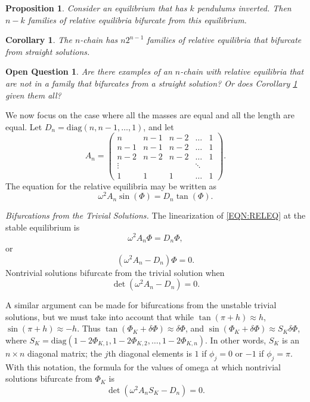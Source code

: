 \documentclass[11pt]{amsart}
\newtheorem{prop}{Proposition}
\newtheorem{corr}{Corollary}
\newtheorem{open}{Open Question}
\newcommand{\diag}{\textrm{diag}}
\begin{document}
\begin{prop}
Consider an equilibrium that has $k$ pendulums inverted.
Then $n-k$ families of relative equilibria bifurcate from this
equilibrium.
\end{prop}

\begin{corr}
The $n$-chain has $n2^{n-1}$ families of relative equilibria that
bifurcate from straight solutions.
\label{COR:COUNT}
\end{corr}

\begin{open}
Are there examples of an $n$-chain with relative equilibria that are not
in a family that bifurcates from a straight solution?
Or does Corollary \ref{COR:COUNT} given them all?
\end{open}

We now focus on the case where all the masses are equal and all the length are equal. 
Let $D_n = \textrm{diag}(n,n-1,\ldots,1)$, and let
\[
   A_n = \begin{pmatrix}
            n &   n-1 & n-2  &\ldots & 1 \\
            n-1 & n-1 & n-2  & \ldots & 1 \\
            n-2 & n-2 & n-2  & \ldots & 1 \\
            \vdots & & & \ddots &  \\
            1 & 1 & 1 & \ldots & 1
          \end{pmatrix}.
\]
The equation for the relative equilibria may be written as
\begin{equation}
    \omega^2 A_n \sin(\Phi) = D_n\tan(\Phi).
    \label{EQN:RELEQ}
\end{equation}


\noindent
\emph{Bifurcations from the Trivial Solutions.}
The linearization of \eqref{EQN:RELEQ} at the stable equilibrium is
\[
   \omega^2 A_n \Phi = D_n \Phi,
\]
or
\[
   \left(\omega^2A_n - D_n\right)\Phi = 0.
\]
Nontrivial solutions bifurcate from the trivial solution when
\[
  \det\left(\omega^2A_n - D_n\right) = 0.
\]

A similar argument can be made for bifurcations from the unstable trivial solutions,
but we must take into account that while $\tan(\pi+h)\approx h$,
$\sin(\pi+h) \approx -h$.
Thus $\tan(\Phi_K + \delta\Phi) \approx \delta\Phi$,
and $\sin(\Phi_K+\delta\Phi) \approx S_K \delta\Phi$, where
$S_K = \diag( 1-2\Phi_{K,1}, 1-2\Phi_{K,2}, \ldots, 1-2\Phi_{K,n})$.
In other words, $S_K$ is an $n\times n$ diagonal matrix; the $j$th diagonal
elements is $1$ if $\phi_j = 0$ or $-1$ if $\phi_j = \pi$.
With this notation, the formula for the values of omega at which nontrivial
solutions bifurcate from $\Phi_K$ is
\begin{equation}
   \det\left(\omega^2A_n S_K - D_n\right) = 0.
\end{equation}
\end{document}
